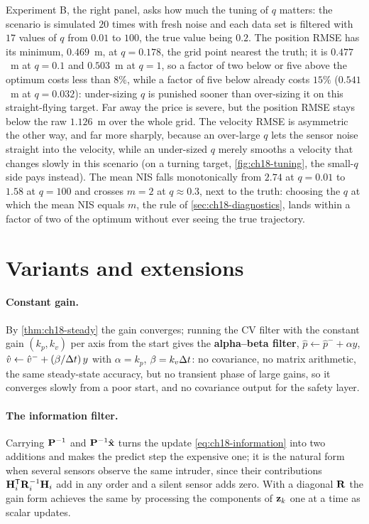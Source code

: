 Experiment B, the right panel, asks how much the tuning of $q$ matters: the
scenario is simulated $20$ times with fresh noise and each data set is
filtered with $17$ values of $q$ from $0.01$ to $100$, the true value being
$0.2$. The position RMSE has its minimum, $0.469$~m, at $q=0.178$, the grid
point nearest the truth; it is $0.477$~m at $q=0.1$ and $0.503$~m at $q=1$,
so a factor of two below or five above the optimum costs less than $8\%$,
while a factor of five below already costs $15\%$ ($0.541$~m at $q=0.032$):
under-sizing $q$ is punished sooner than over-sizing it on this
straight-flying target. Far away the price is severe, but the position RMSE
stays below the raw $1.126$~m over the whole grid. The velocity RMSE is
asymmetric the other way, and far more sharply, because an over-large $q$
lets the sensor noise straight into the velocity, while an under-sized $q$
merely smooths a velocity that changes
slowly in this scenario (on a turning target, \cref{fig:ch18-tuning}, the
small-$q$ side pays instead). The mean NIS falls monotonically from $2.74$
at $q=0.01$ to $1.58$ at $q=100$ and crosses $m=2$ at $q\approx0.3$, next to
the truth: choosing the $q$ at which the mean NIS equals $m$, the rule of
\cref{sec:ch18-diagnostics}, lands within a factor of two of the optimum
without ever seeing the true trajectory.

\section{Variants and extensions}
\label{sec:ch18-variants}

\paragraph{Constant gain.}
By \cref{thm:ch18-steady} the gain converges; running the CV filter with the
constant gain $(k_p,k_v)$ per axis from the start gives the
\textbf{alpha--beta filter},
$\hat p\gets\hat p^-+\alpha y$, $\hat v\gets\hat v^-+(\beta/\Delta t)\,y$ with
$\alpha=k_p$, $\beta=k_v\Delta t$: no covariance, no matrix arithmetic, the same
steady-state accuracy, but no transient phase of large gains, so it
converges slowly from a poor start, and no covariance output for the safety
layer.

\paragraph{The information filter.}
Carrying $\mathbf{P}^{-1}$ and $\mathbf{P}^{-1}\hat{\mathbf{x}}$ turns the update
\cref{eq:ch18-information} into two additions and makes the predict step the
expensive one; it is the natural form when several sensors observe the same
intruder, since their contributions $\mathbf{H}_i^{\mathsf{T}}\mathbf{R}_i^{-1}\mathbf{H}_i$ add
in any order and a silent sensor adds zero. With a diagonal $\mathbf{R}$ the gain
form achieves the same by processing the components of $\mathbf{z}_k$ one at a
time as scalar updates.


